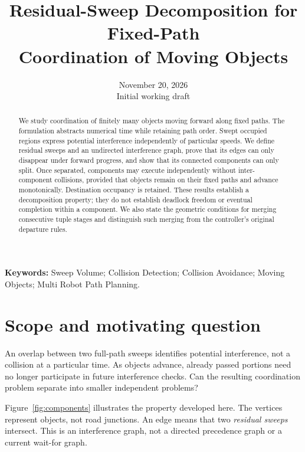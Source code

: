 \documentclass[11pt,a4paper]{article}
\title{Residual-Sweep Decomposition for Fixed-Path\\Coordination of Moving Objects}
\author{}
\date{November 20, 2026\\\small Initial working draft}
\theoremstyle{remark}
\begin{document}
\maketitle

\begin{abstract}
We study coordination of finitely many objects moving forward along fixed
paths. The formulation abstracts numerical time while retaining path order.
Swept occupied regions express potential interference independently of
particular speeds. We define residual sweeps and an undirected interference
graph, prove that its edges can only disappear under forward progress, and
show that its connected components can only split. Once separated, components
may execute independently without inter-component collisions, provided that
objects remain on their fixed paths and advance monotonically. Destination
occupancy is retained. These results establish a decomposition property; they
do not establish deadlock freedom or eventual completion within a component.
We also state the geometric conditions for merging consecutive tuple stages
and distinguish such merging from the controller's original departure rules.
\end{abstract}

\noindent\textbf{Keywords:} Sweep Volume; Collision Detection; Collision
Avoidance; Moving Objects; Multi Robot Path Planning.

\section{Scope and motivating question}

An overlap between two full-path sweeps identifies potential interference,
not a collision at a particular time. As objects advance, already passed
portions need no longer participate in future interference checks. Can the
resulting coordination problem separate into smaller independent problems?

Figure~\ref{fig:components} illustrates the property developed here. The
vertices represent objects, not road junctions. An edge means that two
\emph{residual sweeps} intersect. This is an interference graph, not a
directed precedence graph or a current wait-for graph.
\end{document}
